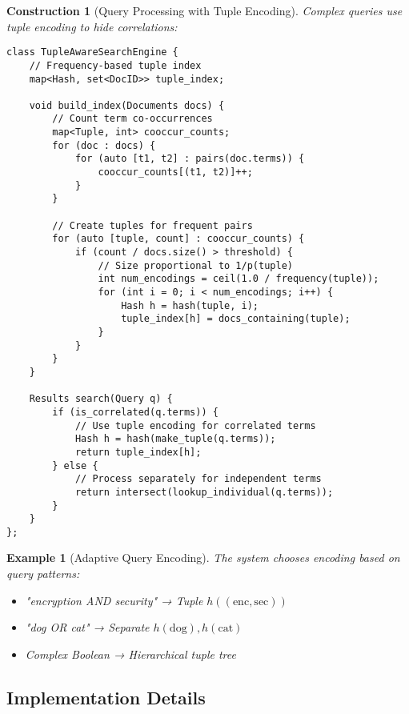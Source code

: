 \documentclass[11pt,final]{article}
\newtheorem{example}[theorem]{Example}
\newtheorem{construction}[theorem]{Construction}
\begin{document}
\begin{construction}[Query Processing with Tuple Encoding]
Complex queries use tuple encoding to hide correlations:
\begin{verbatim}
class TupleAwareSearchEngine {
    // Frequency-based tuple index
    map<Hash, set<DocID>> tuple_index;
    
    void build_index(Documents docs) {
        // Count term co-occurrences
        map<Tuple, int> cooccur_counts;
        for (doc : docs) {
            for (auto [t1, t2] : pairs(doc.terms)) {
                cooccur_counts[(t1, t2)]++;
            }
        }
        
        // Create tuples for frequent pairs
        for (auto [tuple, count] : cooccur_counts) {
            if (count / docs.size() > threshold) {
                // Size proportional to 1/p(tuple)
                int num_encodings = ceil(1.0 / frequency(tuple));
                for (int i = 0; i < num_encodings; i++) {
                    Hash h = hash(tuple, i);
                    tuple_index[h] = docs_containing(tuple);
                }
            }
        }
    }
    
    Results search(Query q) {
        if (is_correlated(q.terms)) {
            // Use tuple encoding for correlated terms
            Hash h = hash(make_tuple(q.terms));
            return tuple_index[h];
        } else {
            // Process separately for independent terms
            return intersect(lookup_individual(q.terms));
        }
    }
};
\end{verbatim}
\end{construction}

\begin{example}[Adaptive Query Encoding]
The system chooses encoding based on query patterns:
\begin{itemize}
    \item "encryption AND security" → Tuple $h((\text{enc}, \text{sec}))$
    \item "dog OR cat" → Separate $h(\text{dog}), h(\text{cat})$
    \item Complex Boolean → Hierarchical tuple tree
\end{itemize}
\end{example}

\subsection{Implementation Details}
\end{document}
